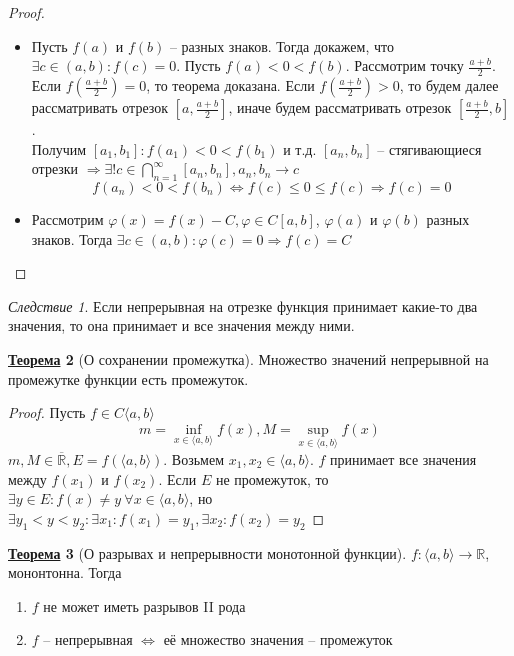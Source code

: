 \documentclass[12pt]{article}
\newenvironment{MyList}[1][4pt]{
  \begin{enumerate}[1.]
  \setlength{\parskip}{0pt}
  \setlength{\itemsep}{#1}
}{       
  \end{enumerate}
}
\newenvironment{MyItemize}[1][4pt]{
  \begin{itemize}
  \setlength{\parskip}{0pt}
  \setlength{\itemsep}{#1}
}{       
  \end{itemize}
}
\def\R{\mathbb{R}}       %
\def\SO{\Rightarrow}     %
\def\EQ{\Leftrightarrow} %
\theoremstyle{definition} %
\newtheorem{Thm}{\underline{Теорема}}[subsection] %
\theoremstyle{plain} %
\theoremstyle{remark} %
\newtheorem{Cons}[Thm]{Следствие} %
\begin{document}
\begin{proof}
    \begin{MyItemize}
        \item Пусть $f(a)$ и $f(b)$ -- разных знаков. Тогда докажем, что $\exists c \in (a, b) : f(c) = 0$. Пусть $f(a) < 0 < f(b)$.
        Рассмотрим точку $ \frac{a + b}{2}$. Если $f( \frac{a + b}{2}) = 0$, то теорема доказана.
        Если $f(\frac{a + b}{2}) > 0$, то будем далее рассматривать отрезок $[a, \frac{a + b}{2}]$, иначе будем рассматривать отрезок $[ \frac{a + b}{2}, b]$. \\
        Получим $[a_1, b_1] : f(a_1) < 0 < f(b_1)$ и т.д. $[a_n, b_n]$ -- стягивающиеся отрезки $\SO \exists ! c \in \bigcap_{n = 1}^\infty [a_n, b_n], a_n, b_n \to c$
        \[f(a_n) < 0 < f(b_n) \EQ f(c) \leqslant 0 \leqslant f(c) \SO f(c) = 0\]         
        \item Рассмотрим $\varphi(x) = f(x) - C, \varphi \in C[a, b]$, $\varphi(a)$ и $\varphi(b)$ разных знаков.
        Тогда $\exists c \in (a, b) : \varphi(c) = 0 \SO f(c) = C$ 
    \end{MyItemize}
\end{proof}

\begin{Cons}
    Если непрерывная на отрезке функция принимает какие-то два значения, то она принимает и все значения между ними.
\end{Cons}

\begin{Thm}[О сохранении промежутка]
    Множество значений непрерывной на промежутке функции есть промежуток. 
\end{Thm}

\begin{proof}
    Пусть $f \in C \langle a, b\rangle$
    \[m = \inf_{x \in \langle a, b\rangle} f(x), M = \sup_{x \in \langle a, b\rangle} f(x)\]
    $m, M \in \overline{\R}, E = f(\langle a, b\rangle)$. Возьмем $x_1, x_2 \in \langle a, b\rangle$. $f$ принимает все значения между $f(x_1)$ и $f(x_2)$.
    Если $E$ не промежуток, то $\exists y \in E : f(x) \neq y \ \forall x \in \langle a, b\rangle$, но $\exists y_1 < y < y_2 : \exists x_1 : f(x_1) = y_1, \exists x_2 : f(x_2) = y_2$       
\end{proof}

\begin{Thm}[О разрывах и непрерывности монотонной функции]
    $f : \langle a, b\rangle \to \R$, мононтонна. Тогда
    \begin{MyList}
        \item $f$ не может иметь разрывов II рода
        \item $f$ -- непрерывная $\EQ$ её множество значения -- промежуток  
    \end{MyList} 
\end{Thm}
\end{document}
